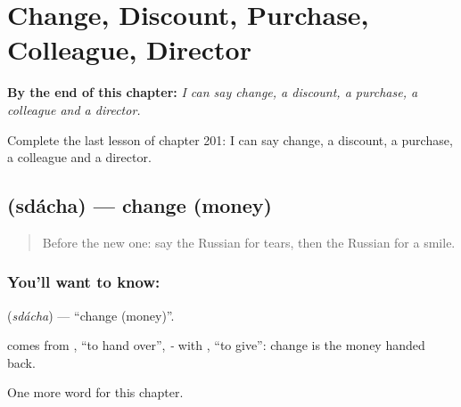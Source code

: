 
\chapter{Change, Discount, Purchase, Colleague, Director}
\label{ch:ru-change-discount-purchase-colleague-director}

\begin{chapteropening}
\textbf{By the end of this chapter:} \emph{I can say change, a discount, a purchase, a colleague and a director.}

Complete the last lesson of chapter 201: I can say change, a discount, a purchase, a colleague and a director.
\end{chapteropening}

\section[\texorpdfstring{\ru{сдача} (sdácha)}{сдача (sdácha)}]{ (sdácha) — change (money)}

\label{lesson:RU-C201-sdacha}



\begin{quote}
Before the new one: say the Russian for tears, then the Russian for a smile.
\end{quote}

\subsection*{You'll want to know: }
\textbf{} (\emph{sdácha}) — \textquotedblleft{}change (money)\textquotedblright{}.

\begin{cousinweb}
\textbf{} comes from \emph{}, \textquotedblleft{}to hand over\textquotedblright{}, \emph{-} with \emph{}, \textquotedblleft{}to give\textquotedblright{}: change is the money handed back.
\end{cousinweb}

\begin{grammarlens}[title={What you've built}]
One more word for this chapter.
\end{grammarlens}

